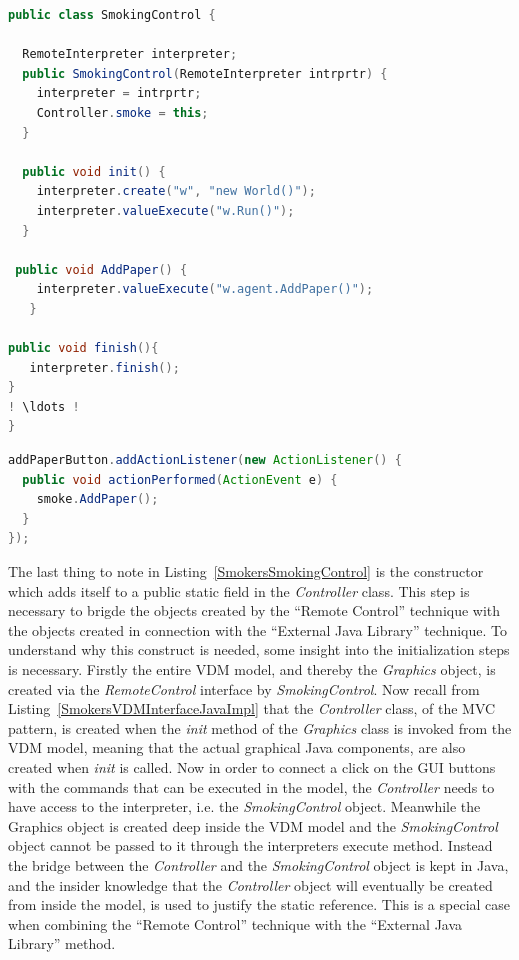 \documentclass{overturerepchap}
\begin{document}
\begin{lstlisting}[language=Java,label=SmokersSmokingControl,caption=Java implementation of the bridge between the GUI and the interpreter executing the VDM model, captionpos=b]
public class SmokingControl {

  RemoteInterpreter interpreter;
  public SmokingControl(RemoteInterpreter intrprtr) {
    interpreter = intrprtr;
    Controller.smoke = this;
  }
  	
  public void init() {
    interpreter.create("w", "new World()");	
    interpreter.valueExecute("w.Run()");
  }

 public void AddPaper() {
    interpreter.valueExecute("w.agent.AddPaper()");
   }

public void finish(){
   interpreter.finish();
}
! \ldots !
}
\end{lstlisting}

\begin{lstlisting}[language=Java,label=SmokersButtonClickAction,caption=Java implementation of the Button click action invoking the remote intepreter, captionpos=b]
addPaperButton.addActionListener(new ActionListener() {
  public void actionPerformed(ActionEvent e) {	
    smoke.AddPaper();
  }
});	
\end{lstlisting}

The last thing to note in Listing~\ref{SmokersSmokingControl} is the constructor which adds itself to a public static field in the \textit{Controller} class. This step is necessary to brigde the objects created by the ``Remote Control'' technique with the objects created in connection with the ``External Java Library'' technique.
To understand why this construct is needed, some insight into the initialization steps is necessary. Firstly the entire VDM model, and thereby the \textit{Graphics} object, is created via the \textit{RemoteControl} interface by \textit{SmokingControl}. Now recall from Listing~\ref{SmokersVDMInterfaceJavaImpl} that the \textit{Controller} class, of the MVC pattern, is created when the \textit{init} method of the \textit{Graphics} class is invoked from the VDM model, meaning that the actual graphical Java components, are also created when \textit{init} is called. Now in order to connect a click on the GUI buttons with the commands that can be executed in the model, the \textit{Controller} needs to have access to the interpreter, i.e. the \textit{SmokingControl} object. Meanwhile the Graphics object is created deep inside the VDM model and the \textit{SmokingControl} object cannot be passed to it through the interpreters execute method. Instead the bridge between the \textit{Controller} and the \textit{SmokingControl} object is kept in Java, and the insider knowledge that the \textit{Controller} object will eventually be created from inside the model, is used  to justify the static reference. This is a special case when combining the ``Remote Control'' technique with the ``External Java Library'' method.
\end{document}
